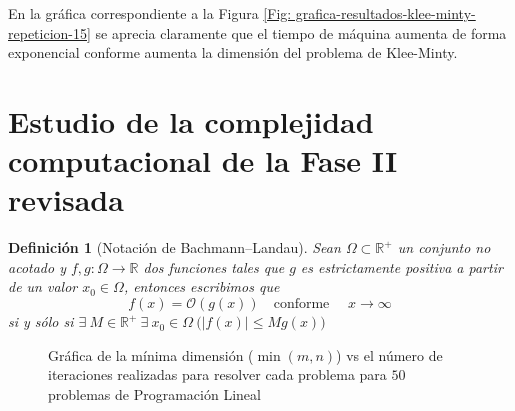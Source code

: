 \documentclass[titlepage]{article}
\newcommand{\Real}{\mathbb{R}}
\newtheorem{mi_def}{Definición}
\begin{document}
\newpage

En la gráfica correspondiente a la Figura \ref{Fig: grafica-resultados-klee-minty-repeticion-15} se aprecia claramente que el tiempo de máquina aumenta de forma exponencial conforme aumenta la dimensión del problema de Klee-Minty.

\section{Estudio de la complejidad computacional de la Fase II revisada}

\begin{mi_def}[Notación de Bachmann–Landau]
    Sean $\Omega \subset \Real^+$ un conjunto no acotado y \newline $f,g: \Omega \longrightarrow \Real$ dos funciones tales que $g$ es estrictamente positiva a partir de un valor $x_0 \in \Omega$, entonces escribimos que 
    \begin{equation*}
        f(x) = \mathcal{O}(g(x)) \quad \text{conforme }\quad x \longrightarrow \infty
    \end{equation*}
    si y sólo si $\exists \ M \in \Real^+ \ \exists \ x_0 \in \Omega \ \Big(|f(x)| \leq Mg(x)\Big)$
\end{mi_def}

\begin{figure}[ht]
    \centering
    
    \caption{Gráfica de la mínima dimensión ($\min(m,n)$) vs el número de iteraciones realizadas para resolver cada problema para $50$ problemas de Programación Lineal}
    \label{Fig: grafica-complejidad-compu}
\end{figure}

\newpage
\end{document}
